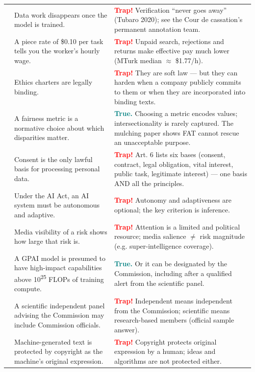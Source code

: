 \documentclass[11pt,a4paper]{article}
\begin{document}
\begin{longtable}{>{\RaggedRight\arraybackslash}p{0.5cm}>{\RaggedRight\arraybackslash}p{7.6cm}>{\RaggedRight\arraybackslash}p{7.4cm}}
8 & Data work disappears once the model is trained. & \textcolor{red}{\textbf{Trap!}} Verification “never goes away” (Tubaro 2020); see the Cour de cassation’s permanent annotation team.\\[3pt]
9 & A piece rate of \$0.10 per task tells you the worker’s hourly wage. & \textcolor{red}{\textbf{Trap!}} Unpaid search, rejections and returns make effective pay much lower (MTurk median $\approx$ \$1.77/h).\\[3pt]
10 & Ethics charters are legally binding. & \textcolor{red}{\textbf{Trap!}} They are soft law — but they can harden when a company publicly commits to them or when they are incorporated into binding texts.\\[3pt]
11 & A fairness metric is a normative choice about which disparities matter. & \textcolor{teal}{\textbf{True.}} Choosing a metric encodes values; intersectionality is rarely captured. The mulching paper shows FAT cannot rescue an unacceptable purpose.\\[3pt]
12 & Consent is the only lawful basis for processing personal data. & \textcolor{red}{\textbf{Trap!}} Art. 6 lists six bases (consent, contract, legal obligation, vital interest, public task, legitimate interest) — one basis AND all the principles.\\[3pt]
13 & Under the AI Act, an AI system must be autonomous and adaptive. & \textcolor{red}{\textbf{Trap!}} Autonomy and adaptiveness are optional; the key criterion is inference.\\[3pt]
14 & Media visibility of a risk shows how large that risk is. & \textcolor{red}{\textbf{Trap!}} Attention is a limited and political resource; media salience $\neq$ risk magnitude (e.g. super-intelligence coverage).\\[3pt]
15 & A GPAI model is presumed to have high-impact capabilities above 10\textsuperscript{25} FLOPs of training compute. & \textcolor{teal}{\textbf{True.}} Or it can be designated by the Commission, including after a qualified alert from the scientific panel.\\[3pt]
16 & A scientific independent panel advising the Commission may include Commission officials. & \textcolor{red}{\textbf{Trap!}} Independent means independent from the Commission; scientific means research-based members (official sample answer).\\[3pt]
17 & Machine-generated text is protected by copyright as the machine’s original expression. & \textcolor{red}{\textbf{Trap!}} Copyright protects original expression by a human; ideas and algorithms are not protected either.\\[3pt]

\end{longtable}
\end{document}
